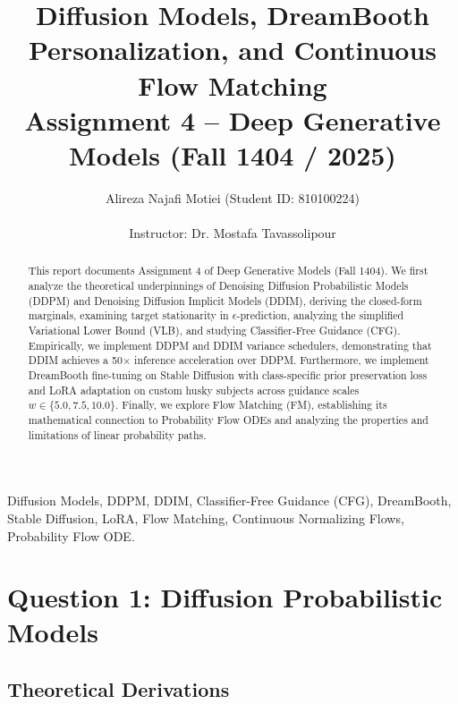 \documentclass[10pt,journal,compsoc]{IEEEtran}
\begin{document}
\title{Diffusion Models, DreamBooth Personalization, and Continuous Flow Matching\\
\large Assignment 4 -- Deep Generative Models (Fall 1404 / 2025)}

\author{Alireza Najafi Motiei (Student ID: 810100224)\\
\\
Instructor: Dr. Mostafa Tavassolipour}


\maketitle

\begin{abstract}
This report documents Assignment 4 of Deep Generative Models (Fall 1404). We first analyze the theoretical underpinnings of Denoising Diffusion Probabilistic Models (DDPM) and Denoising Diffusion Implicit Models (DDIM), deriving the closed-form marginals, examining target stationarity in $\epsilon$-prediction, analyzing the simplified Variational Lower Bound (VLB), and studying Classifier-Free Guidance (CFG). Empirically, we implement DDPM and DDIM variance schedulers, demonstrating that DDIM achieves a 50$\times$ inference acceleration over DDPM. Furthermore, we implement DreamBooth fine-tuning on Stable Diffusion with class-specific prior preservation loss and LoRA adaptation on custom husky subjects across guidance scales $w \in \{5.0, 7.5, 10.0\}$. Finally, we explore Flow Matching (FM), establishing its mathematical connection to Probability Flow ODEs and analyzing the properties and limitations of linear probability paths.
\end{abstract}

\begin{IEEEkeywords}
Diffusion Models, DDPM, DDIM, Classifier-Free Guidance (CFG), DreamBooth, Stable Diffusion, LoRA, Flow Matching, Continuous Normalizing Flows, Probability Flow ODE.
\end{IEEEkeywords}

\section{Question 1: Diffusion Probabilistic Models}

\subsection{Theoretical Derivations}
\end{document}
